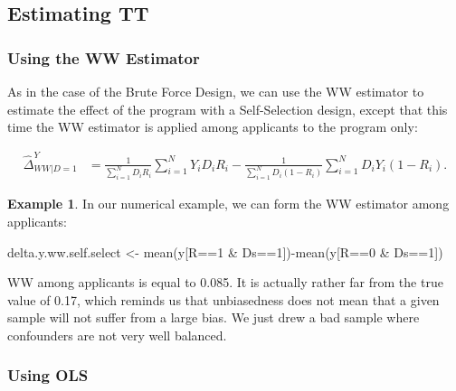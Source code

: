 \documentclass[
]{book}
\newenvironment{Shaded}{\begin{snugshade}}{\end{snugshade}}
\newcommand{\DecValTok}[1]{\textcolor[rgb]{0.00,0.00,0.81}{#1}}
\newcommand{\FunctionTok}[1]{\textcolor[rgb]{0.00,0.00,0.00}{#1}}
\newcommand{\NormalTok}[1]{#1}
\newcommand{\OtherTok}[1]{\textcolor[rgb]{0.56,0.35,0.01}{#1}}
\newcommand{\SpecialCharTok}[1]{\textcolor[rgb]{0.00,0.00,0.00}{#1}}
\theoremstyle{definition}
\theoremstyle{definition}
\newtheorem{example}{Example}[chapter]
\theoremstyle{definition}
\theoremstyle{definition}
\theoremstyle{remark}
\begin{document}
\hypertarget{estimating-tt}{%
\subsection{Estimating TT}\label{estimating-tt}}

\hypertarget{using-the-ww-estimator-1}{%
\subsubsection{Using the WW Estimator}\label{using-the-ww-estimator-1}}

As in the case of the Brute Force Design, we can use the WW estimator to estimate the effect of the program with a Self-Selection design, except that this time the WW estimator is applied among applicants to the program only:

\begin{align*}
  \hat{\Delta}^Y_{WW|D=1} & = \frac{1}{\sum_{i=1}^N D_iR_i}\sum_{i=1}^N Y_iD_iR_i-\frac{1}{\sum_{i=1}^N D_i(1-R_i)}\sum_{i=1}^N D_iY_i(1-R_i).
\end{align*}

\begin{example}
\protect\hypertarget{exm:unnamed-chunk-83}{}{\label{exm:unnamed-chunk-83} }In our numerical example, we can form the WW estimator among applicants:
\end{example}

\begin{Shaded}
\begin{Highlighting}[]
\NormalTok{delta.y.ww.self.select }\OtherTok{\textless{}{-}} \FunctionTok{mean}\NormalTok{(y[R}\SpecialCharTok{==}\DecValTok{1} \SpecialCharTok{\&}\NormalTok{ Ds}\SpecialCharTok{==}\DecValTok{1}\NormalTok{])}\SpecialCharTok{{-}}\FunctionTok{mean}\NormalTok{(y[R}\SpecialCharTok{==}\DecValTok{0} \SpecialCharTok{\&}\NormalTok{ Ds}\SpecialCharTok{==}\DecValTok{1}\NormalTok{])}
\end{Highlighting}
\end{Shaded}

WW among applicants is equal to 0.085.
It is actually rather far from the true value of 0.17, which reminds us that unbiasedness does not mean that a given sample will not suffer from a large bias.
We just drew a bad sample where confounders are not very well balanced.

\hypertarget{using-ols-1}{%
\subsubsection{Using OLS}\label{using-ols-1}}
\end{document}
